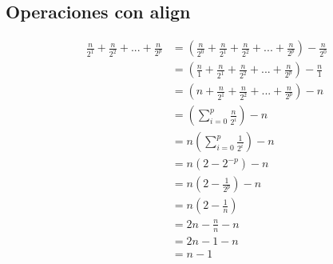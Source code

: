 \subsection{Operaciones con align}
\begin{align*}
    \frac{n}{2^1} + \frac{n}{2^2} + ... + \frac{n}{2^p} 
    &= (\frac{n}{2^0} + \frac{n}{2^1} + \frac{n}{2^2} + ... + \frac{n}{2^p}) - \frac{n}{2^0}\\
    &= (\frac{n}{1} + \frac{n}{2^1} + \frac{n}{2^2} + ... + \frac{n}{2^p}) -\frac{n}{1}\\
    &= (n + \frac{n}{2^1} + \frac{n}{2^2} + ... + \frac{n}{2^p}) - n\\
    &= (\sum_{i=0}^{p} \frac{n}{2^i}) - n \\
    &= n(\sum_{i=0}^{p} \frac{1}{2^i}) - n \\
    &= n(2 - 2^{-p}) - n\\
    &= n(2 - \frac{1}{2^{p}}) - n\\
    &= n(2 - \frac{1}{n})\\
    &= 2n - \frac{n}{n} - n\\
    &= 2n - 1 - n\\
    &= n - 1
\end{align*}

